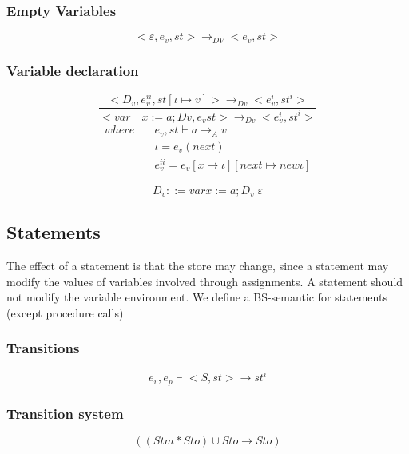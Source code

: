 \subsubsection{Empty Variables}
\begin{equation}
	<\varepsilon,{ e }_{ v },st>{ \rightarrow  }_{ DV }<{ e }_{ v },st>
\end{equation}


\subsubsection{Variable declaration}
\begin{equation}
	\frac { <{ D }_{ v },{ e }_{ v }^{ ii },st[\iota \mapsto v]>{ \rightarrow  }_{ Dv }<{ e }_{ v }^{ i },{ st }^{ i }> }{ <var\quad x:=a;Dv,{ e }_{ v }st>{ \rightarrow  }_{ Dv }<{ e }_{ v }^{ i },{ st }^{ i }> } 
\end{equation}
\begin{align*}
	where\quad &{ e }_{ v },st\vdash a{ \rightarrow  }_{ A }v \\
	&\iota {= e }_{ v }(next) \\
	&{ e }_{ v }^{ ii }={ e }_{ v }[x\mapsto \iota ][next\mapsto new \iota ]
\end{align*}

\begin{equation}
	{ D }_{ v }::=var x:=a; { D }_{ v } | \varepsilon
\end{equation}


\subsection*{Statements}
The effect of a statement is that the store may change, since a statement may modify the values of variables involved through assignments.
A statement should not modify the variable environment.
We define a BS-semantic for statements (except procedure calls)

\subsubsection{Transitions}
\begin{equation}
	{ e }_{ v },{ e }_{ p }\vdash <S,st>\rightarrow { st }^{ i }
\end{equation}


\subsubsection{Transition system}
\begin{equation}
	{((Stm\ast  Sto)\cup Sto \rightarrow Sto) }
\end{equation}


